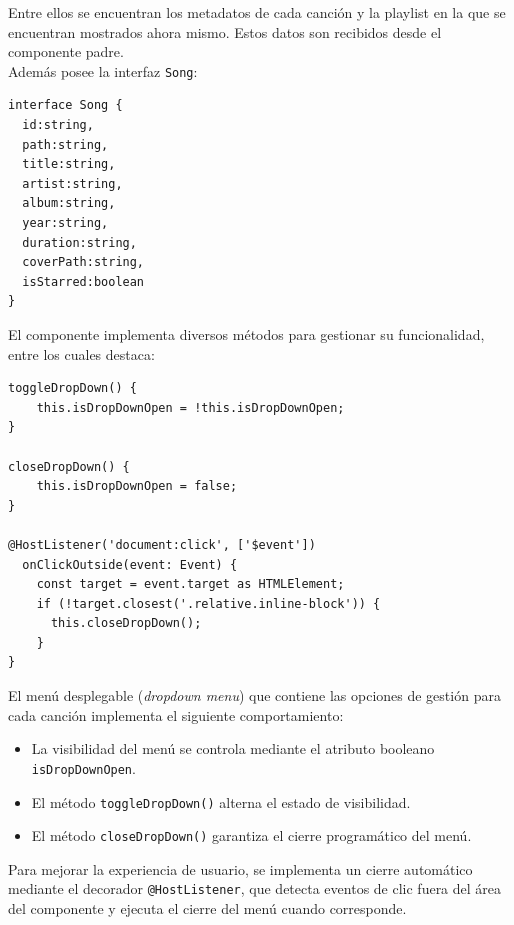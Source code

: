 \documentclass[11pt, a4paper]{article}
\begin{document}
                Entre ellos se encuentran los metadatos de cada canción y la playlist en la que se encuentran mostrados ahora mismo. Estos datos son recibidos desde el componente padre. \\

                Además posee la interfaz \texttt{Song}:

                \begin{lstlisting}[caption={Song}]
interface Song {
  id:string,
  path:string,
  title:string,
  artist:string,
  album:string,
  year:string,
  duration:string,
  coverPath:string,
  isStarred:boolean
}
                \end{lstlisting}

                El componente implementa diversos métodos para gestionar su funcionalidad, entre los cuales destaca:

                \begin{lstlisting}[caption={Dropdown menu}]
toggleDropDown() {
    this.isDropDownOpen = !this.isDropDownOpen;
}

closeDropDown() {
    this.isDropDownOpen = false;
}

@HostListener('document:click', ['$event'])
  onClickOutside(event: Event) {
    const target = event.target as HTMLElement;
    if (!target.closest('.relative.inline-block')) {
      this.closeDropDown();
    }
}
                \end{lstlisting}

                El menú desplegable (\textit{dropdown menu}) que contiene las opciones de gestión para cada canción implementa el siguiente comportamiento:

                \begin{itemize}
                  \item La visibilidad del menú se controla mediante el atributo booleano \texttt{isDropDownOpen}.
                  \item El método \texttt{toggleDropDown()} alterna el estado de visibilidad.
                  \item El método \texttt{closeDropDown()} garantiza el cierre programático del menú.
                \end{itemize}

                Para mejorar la experiencia de usuario, se implementa un cierre automático mediante el decorador \texttt{@HostListener}, que detecta eventos de clic fuera del área del componente y ejecuta el cierre del menú cuando corresponde.
\end{document}
